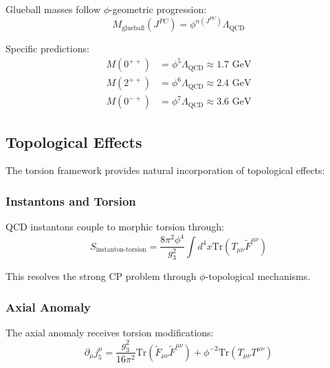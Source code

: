 \begin{theorem}
Glueball masses follow $\phi$-geometric progression:
\begin{equation}
M_{\text{glueball}}(J^{PC}) = \phi^{n(J^{PC})} \Lambda_{\text{QCD}}
\label{eq:phi_glueball_spectrum}
\end{equation}
\end{theorem}

Specific predictions:
\begin{align}
M(0^{++}) &= \phi^5 \Lambda_{\text{QCD}} \approx 1.7 \text{ GeV} \\
M(2^{++}) &= \phi^6 \Lambda_{\text{QCD}} \approx 2.4 \text{ GeV} \\
M(0^{-+}) &= \phi^7 \Lambda_{\text{QCD}} \approx 3.6 \text{ GeV}
\end{align}

\subsection{Topological Effects}

The torsion framework provides natural incorporation of topological effects:

\subsubsection{Instantons and Torsion}

\begin{theorem}
QCD instantons couple to morphic torsion through:
\begin{equation}
S_{\text{instanton-torsion}} = \frac{8\pi^2 \phi^4}{g_3^2} \int d^4x \text{Tr}(T_{\mu\nu} \tilde{F}^{\mu\nu})
\label{eq:instanton_torsion_coupling}
\end{equation}
\end{theorem}

This resolves the strong CP problem through $\phi$-topological mechanisms.

\subsubsection{Axial Anomaly}

The axial anomaly receives torsion modifications:
\begin{equation}
\partial_\mu j_5^\mu = \frac{g_3^2}{16\pi^2} \text{Tr}(\tilde{F}_{\mu\nu} \tilde{F}^{\mu\nu}) + \phi^{-2} \text{Tr}(T_{\mu\nu} T^{\mu\nu})
\end{equation}

